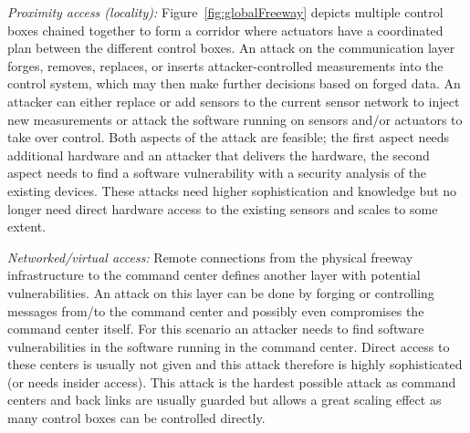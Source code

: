 \emph{Proximity access (locality):}
Figure~\ref{fig:globalFreeway} depicts multiple control boxes chained together to form a corridor
where actuators have a coordinated plan between the different control
boxes. An attack on the communication layer forges, removes, replaces, or
inserts attacker-controlled measurements into the control system, which may then make further decisions based on forged data. An attacker can either replace or add sensors to
the current sensor network to inject new measurements or attack the software
running on sensors and/or actuators to take over control. Both aspects of the
attack are feasible; the first aspect needs additional hardware and an attacker
that delivers the hardware, the second aspect needs to find a software
vulnerability with a security analysis of the existing devices. These attacks
need higher sophistication and knowledge but no longer need direct hardware
access to the existing sensors and scales to some extent.

\emph{Networked/virtual access:}
Remote connections from the physical freeway infrastructure to the command center defines another layer with potential vulnerabilities. An attack on this layer can be done by forging or controlling messages from/to the command center and
possibly even compromises the command center itself. For this scenario an
attacker needs to find software vulnerabilities in the software running in the
command center. Direct access to these centers is usually not given and this
attack therefore is highly sophisticated (or needs insider access). This attack
is the hardest possible attack as command centers and back links are usually
guarded but allows a great scaling effect as many control boxes can be
controlled directly.

